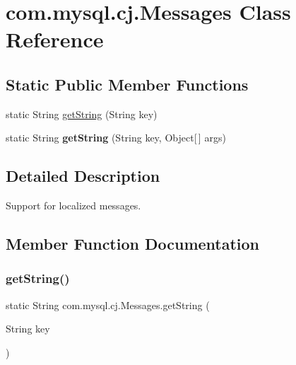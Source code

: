 \hypertarget{classcom_1_1mysql_1_1cj_1_1_messages}{}\section{com.\+mysql.\+cj.\+Messages Class Reference}
\label{classcom_1_1mysql_1_1cj_1_1_messages}
\subsection*{Static Public Member Functions}
\begin{DoxyCompactItemize}
\item 
static String \mbox{\hyperlink{classcom_1_1mysql_1_1cj_1_1_messages_a86a388448aa7759254c491b3e1320d31}{get\+String}} (String key)
\item 
\mbox{\label{classcom_1_1mysql_1_1cj_1_1_messages_afbedd0a83c03079eb52039039a24f386}} 
static String {\bfseries get\+String} (String key, Object\mbox{[}$\,$\mbox{]} args)
\end{DoxyCompactItemize}


\subsection{Detailed Description}
Support for localized messages. 

\subsection{Member Function Documentation}
\mbox{\label{classcom_1_1mysql_1_1cj_1_1_messages_a86a388448aa7759254c491b3e1320d31}} 
\subsubsection{\texorpdfstring{get\+String()}{getString()}}
{\footnotesize\ttfamily static String com.\+mysql.\+cj.\+Messages.\+get\+String (\begin{DoxyParamCaption}\item[{String}]{key }\end{DoxyParamCaption})\hspace{0.3cm}{\ttfamily [static]}}

